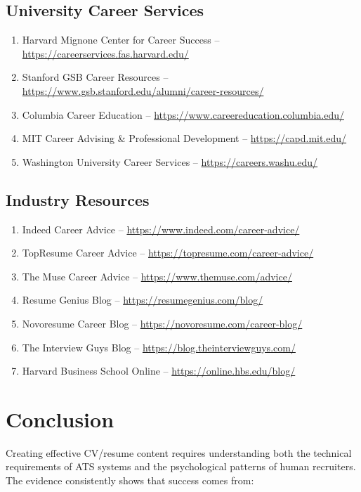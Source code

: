 \documentclass[11pt,a4paper]{article}
\begin{document}
\subsection{University Career Services}

\begin{enumerate}
    \item Harvard Mignone Center for Career Success -- \url{https://careerservices.fas.harvard.edu/}
    \item Stanford GSB Career Resources -- \url{https://www.gsb.stanford.edu/alumni/career-resources/}
    \item Columbia Career Education -- \url{https://www.careereducation.columbia.edu/}
    \item MIT Career Advising \& Professional Development -- \url{https://capd.mit.edu/}
    \item Washington University Career Services -- \url{https://careers.washu.edu/}
\end{enumerate}

\subsection{Industry Resources}

\begin{enumerate}
    \item Indeed Career Advice -- \url{https://www.indeed.com/career-advice/}
    \item TopResume Career Advice -- \url{https://topresume.com/career-advice/}
    \item The Muse Career Advice -- \url{https://www.themuse.com/advice/}
    \item Resume Genius Blog -- \url{https://resumegenius.com/blog/}
    \item Novoresume Career Blog -- \url{https://novoresume.com/career-blog/}
    \item The Interview Guys Blog -- \url{https://blog.theinterviewguys.com/}
    \item Harvard Business School Online -- \url{https://online.hbs.edu/blog/}
\end{enumerate}

\section{Conclusion}

Creating effective CV/resume content requires understanding both the technical requirements of ATS systems and the psychological patterns of human recruiters. The evidence consistently shows that success comes from:
\end{document}
